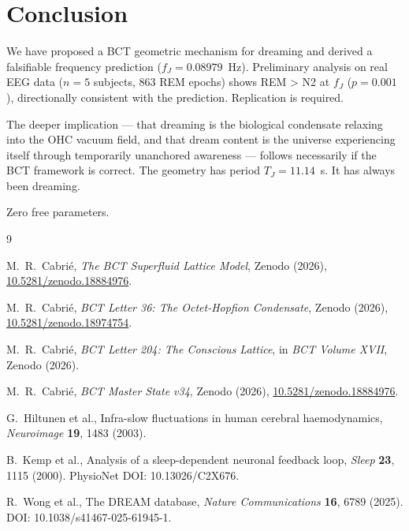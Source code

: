 \documentclass[aps,prl,twocolumn,showpacs,preprintnumbers]{revtex4-2}
\newcommand{\fJ}{f_J}
\begin{document}
\section{Conclusion}

We have proposed a BCT geometric mechanism for dreaming and
derived a falsifiable frequency prediction ($\fJ = 0.08979$~Hz).
Preliminary analysis on real EEG data ($n=5$ subjects, 863 REM
epochs) shows REM > N2 at $\fJ$ ($p = 0.001$), directionally
consistent with the prediction. Replication is required.

The deeper implication --- that dreaming is the biological
condensate relaxing into the OHC vacuum field, and that dream
content is the universe experiencing itself through temporarily
unanchored awareness --- follows necessarily if the BCT framework
is correct. The geometry has period $T_J = 11.14$~s.
It has always been dreaming.

Zero free parameters.

\begin{thebibliography}{9}

M.~R.\ Cabri\'e,
\textit{The BCT Superfluid Lattice Model},
Zenodo (2026),
\href{https://doi.org/10.5281/zenodo.18884976}{10.5281/zenodo.18884976}.

M.~R.\ Cabri\'e,
\textit{BCT Letter 36: The Octet-Hopfion Condensate},
Zenodo (2026),
\href{https://doi.org/10.5281/zenodo.18974754}{10.5281/zenodo.18974754}.

M.~R.\ Cabri\'e,
\textit{BCT Letter 204: The Conscious Lattice},
in \textit{BCT Volume XVII}, Zenodo (2026).

M.~R.\ Cabri\'e,
\textit{BCT Master State v34},
Zenodo (2026),
\href{https://doi.org/10.5281/zenodo.18884976}{10.5281/zenodo.18884976}.

G.~Hiltunen et al.,
Infra-slow fluctuations in human cerebral haemodynamics,
\textit{Neuroimage} \textbf{19}, 1483 (2003).

B.~Kemp et al.,
Analysis of a sleep-dependent neuronal feedback loop,
\textit{Sleep} \textbf{23}, 1115 (2000).
PhysioNet DOI: 10.13026/C2X676.

R.~Wong et al.,
The DREAM database,
\textit{Nature Communications} \textbf{16}, 6789 (2025).
DOI: 10.1038/s41467-025-61945-1.

\end{thebibliography}
\end{document}
